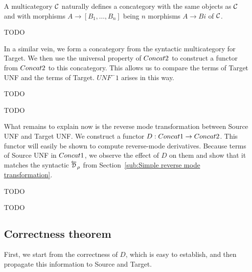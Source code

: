 \begin{definition}
    A multicategory $\mathcal{C}$ naturally defines a concategory with the same objects as $\mathcal{C}$ and
    with morphisms $A\to [B_1,\ldots,B_n]$ being $n$ morphisms $A\to Bi$ of $\mathcal{C}$. 
\end{definition}

\begin{proposition}
    TODO
\end{proposition}

In a similar vein, we form a concategory from the syntactic multicategory for Target.
We then use the universal property of $Concat2$ to construct a functor from $Concat2$ to this concategory.
This allows us to compare the terms of Target UNF and the terms of Target. 
$UNF^-1$ arises in this way.

\begin{definition}
    TODO
\end{definition}

\begin{proposition}
    TODO
\end{proposition}

What remains to explain now is the reverse mode transformation between Source UNF and Target UNF.
We construct a functor $D:Concat1\to Concat2$. 
This functor will easily be shown to compute reverse-mode derivatives.
Because terms of Source UNF in $Concat1$, we observe the effect of $D$ on them
and show that it matches the syntactic $\Dsynrevsymbol_{\rho}$ 
from Section~\ref{sub:Simple reverse mode transformation}.

\begin{definition}
    TODO
\end{definition}

\begin{proposition}
    TODO
\end{proposition}


\subsection{Correctness theorem} %
\label{sub:Correctness theorem}

First, we start from the correctness of $D$, which is easy to establish, 
and then propagate this information to Source and Target.

